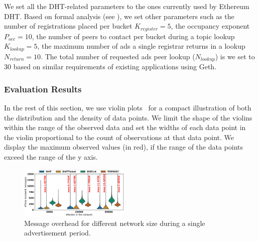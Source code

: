 We set all the DHT-related parameters to the ones currently used by Ethereum DHT.%
Based on formal analysis (see ), we set other \sysname parameters such as the number of registrations placed per bucket $K_\textit{register}= 5$, the occupancy exponent $P_\textit{occ} = 10$, the number of peers to contact per bucket during a topic lookup $K_\textit{lookup}=5$, the maximum number of ads a single registrar returns in a lookup $N_\textit{return}=10$. The total number of requested ads peer lookup (\ie $N_\textit{lookup}$) is we set to 30 based on similar requirements of existing applications using Geth.


\subsubsection{Evaluation Results}

In the rest of this section, we use violin plots~\cite{violin-plots} for a compact illustration of both the distribution and the density of data points. We limit the shape of the violins within the range of the observed data and set the widths of each data point in the violin proportional to the count of observations at that data point. 
We display the maximum observed values (in red), if the range of the data points exceed the range of the y axis. 


\begin{figure}[!h]
\centering
\includegraphics[width=0.470\textwidth]{results/no_split/violin_size_totalMsg.eps}
\caption{Message overhead for different network size during a single advertisement period.}
\label{fig:msgsPerSize}
\vspace{-0.05in}
\end{figure}


